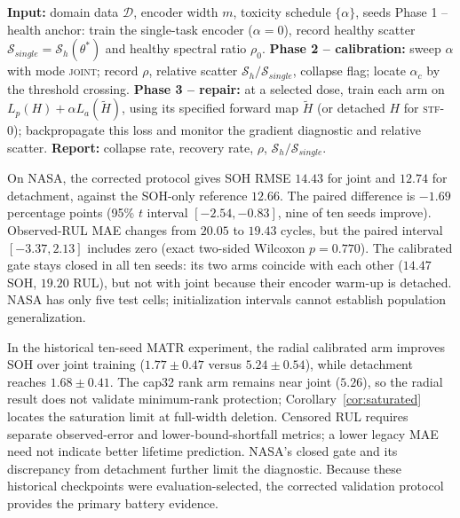 \documentclass{article}
\begin{document}
\begin{algorithm}[h]
\caption{STF training protocol (per domain, per configuration)}
\label{alg:stf}
\begin{algorithmic}[1]
\STATE \textbf{Input:} domain data $\mathcal{D}$, encoder width $m$, toxicity schedule $\{\alpha\}$, seeds
\STATE Phase 1 -- health anchor: train the single-task encoder ($\alpha=0$), record healthy scatter $\mathcal{S}_{single}=\mathcal{S}_h(\theta^*)$ and healthy spectral ratio $\rho_0$.
\STATE \textbf{Phase 2 -- calibration:} sweep $\alpha$ with mode \textsc{joint}; record $\rho$, relative scatter $\mathcal{S}_h/\mathcal{S}_{single}$, collapse flag; locate $\alpha_c$ by the threshold crossing.
\STATE \textbf{Phase 3 -- repair:} at a selected dose, train each arm on $L_p(H)+\alpha L_a(\widetilde H)$, using its specified forward map $\widetilde H$ (or detached $H$ for \textsc{stf-0}); backpropagate this loss and monitor the gradient diagnostic and relative scatter.
\STATE \textbf{Report:} collapse rate, recovery rate, $\rho$, $\mathcal{S}_h/\mathcal{S}_{single}$.
\end{algorithmic}
\end{algorithm}

On NASA, the corrected protocol gives SOH RMSE $14.43$ for joint and $12.74$ for detachment, against the SOH-only reference $12.66$. The paired difference is $-1.69$ percentage points (95\% $t$ interval $[-2.54,-0.83]$, nine of ten seeds improve). Observed-RUL MAE changes from $20.05$ to $19.43$ cycles, but the paired interval $[-3.37,2.13]$ includes zero (exact two-sided Wilcoxon $p=0.770$). The calibrated gate stays closed in all ten seeds: its two arms coincide with each other ($14.47$ SOH, $19.20$ RUL), but not with joint because their encoder warm-up is detached. NASA has only five test cells; initialization intervals cannot establish population generalization.

In the historical ten-seed MATR experiment, the radial calibrated arm improves SOH over joint training ($1.77\pm0.47$ versus $5.24\pm0.54$), while detachment reaches $1.68\pm0.41$. The cap32 rank arm remains near joint ($5.26$), so the radial result does not validate minimum-rank protection; Corollary~\ref{cor:saturated} locates the saturation limit at full-width deletion. Censored RUL requires separate observed-error and lower-bound-shortfall metrics; a lower legacy MAE need not indicate better lifetime prediction. NASA's closed gate and its discrepancy from detachment further limit the diagnostic. Because these historical checkpoints were evaluation-selected, the corrected validation protocol provides the primary battery evidence.
\end{document}
